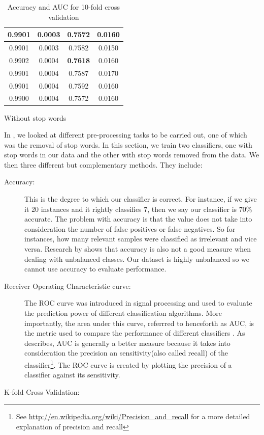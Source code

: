 \begin{table}
\begin{subtable}{.5\linewidth}
\begin{tabular}{cccc}
      0.9901          & 0.0003        & 0.7572          & 0.0160 \\ \midrule
      0.9901          & 0.0003        & 0.7582          & 0.0150 \\
      0.9902          & 0.0004        & \textbf{0.7618} & 0.0160 \\
      0.9901          & 0.0004        & 0.7587          & 0.0170 \\
      0.9901          & 0.0004        & 0.7592          & 0.0160 \\
      0.9900          & 0.0004        & 0.7572          & 0.0160 \\ \bottomrule
    \end{tabular}
      \caption{Without stop words}
      \label{tab:data-without-stopwords}
  \end{subtable}
\caption{Accuracy and AUC for 10-fold cross validation}
\label{tab:with-without-stopwords-data-tables}
\end{table}

In , we looked at different pre-processing tasks to be
carried out, one of which was the removal of stop words. In this section, we train two classifiers,
one with stop words in our data and the other with stop words removed from the data. We then three
different but complementary methods. They include:

\begin{description}
  \item[Accuracy:] This is the degree to which our classifier is correct. For instance, if we give
    it 20 instances and it rightly classifies 7, then we say our classifier is 70\% accurate. The
    problem with accuracy is that the value does not take into consideration the number of false
    positives or false negatives. So for instances, how many relevant samples were classified as
    irrelevant and vice versa. Research  by \citet{ling2003auc} shows that accuracy is also not a
    good measure when dealing with unbalanced classes. Our dataset is highly unbalanced so we cannot
    use accuracy to evaluate performance.

  \item[Receiver Operating Characteristic curve:] The ROC curve was introduced in signal processing
    and used to evaluate the prediction power of different classification algorithms. More
    importantly, the area under this curve, referrred to henceforth as AUC, is the metric used to
    compare the performance of different classifiers \citep{bradley1997use}. As \citet{ling2003auc}
    describes, AUC is generally a better measure because it takes into consideration the precision
    an sensitivity(also called recall) of the classifier\footnote{See
      \url{http://en.wikipedia.org/wiki/Precision_and_recall} for a more detailed explanation of
    precision and recall}. The ROC curve is created by plotting the precision of a classifier
    against its sensitivity.

  \item[K-fold Cross Validation:]
\end{description}

